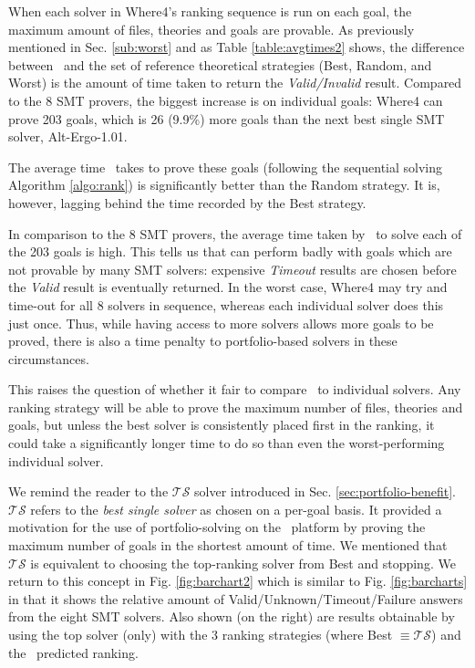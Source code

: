 When each solver in \textsf{Where4}'s ranking sequence is run on each goal, the maximum amount of files, theories and goals are provable. 
As previously mentioned in Sec. \ref{sub:worst} and as Table \ref{table:avgtimes2} shows, the difference between \where~and the set of reference theoretical strategies (\textsf{Best}, \textsf{Random}, and \textsf{Worst}) is the amount of time taken to return the \textit{Valid/Invalid} result. 
Compared to the 8 SMT provers, the biggest increase is on individual goals: \textsf{Where4} can prove 203 goals, which is 26 (9.9\%) more goals than the next best single SMT solver, Alt-Ergo-1.01.

The average time \where~takes to prove these goals (following the sequential solving Algorithm \ref{algo:rank}) is significantly better than the \textsf{Random} strategy.
It is, however, lagging behind the time recorded by the \textsf{Best} strategy. 

In comparison to the 8 SMT provers, the average time taken by \where~to solve each of the 203 goals is high. 
This tells us that \where can perform badly with goals which are not provable by many SMT solvers: expensive \textit{Timeout} results are chosen before the \textit{Valid} result is eventually returned. 
In the worst case, \textsf{Where4} may try and time-out for all 8 solvers in sequence, whereas each individual solver does this just once. 
Thus, while having access to more solvers allows more goals to be proved, there is also a time penalty to portfolio-based solvers in these circumstances.

This raises the question of whether it fair to compare \where~to individual solvers. 
Any ranking strategy will be able to prove the maximum number of files, theories and goals, but unless the best solver is consistently placed first in the ranking, it could take a significantly longer time to do so than even the worst-performing individual solver.   

We remind the reader to the $\mathcal{TS}$ solver introduced in Sec. \ref{sec:portfolio-benefit}.
$\mathcal{TS}$ refers to the \textit{best single solver} as chosen on a per-goal basis.
It provided a motivation for the use of portfolio-solving on the \why~platform by proving the maximum number of goals in the shortest amount of time.
We mentioned that $\mathcal{TS}$ is equivalent to choosing  the top-ranking solver from \textsf{Best} and stopping.
We return to this concept in Fig. \ref{fig:barchart2} which is similar to Fig. \ref{fig:barcharts} in that it shows the relative amount of Valid/Unknown/Timeout/Failure answers from the eight SMT solvers. 
Also shown (on the right) are results obtainable by using the top solver (only) with the 3 ranking strategies (where \textsf{Best} $\equiv\mathcal{TS}$) and the \where~predicted ranking.

